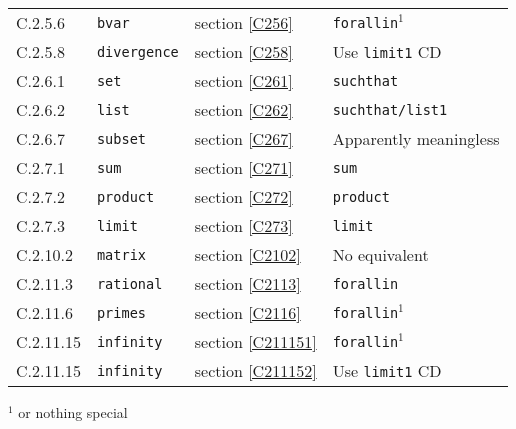 \documentclass{llncs}
\begin{document}
{\begin{table}[h]
\begin{tabular}{llll}
C.2.5.6&{\tt bvar}&section \ref{C256}&{\tt forallin}${}^1$\\
C.2.5.8&{\tt divergence}&section \ref{C258}&Use {\tt limit1} CD\\
C.2.6.1&{\tt set}&section \ref{C261}&{\tt suchthat}\\
C.2.6.2&{\tt list}&section \ref{C262}&{\tt suchthat/list1}\\
C.2.6.7&{\tt subset}&section \ref{C267}&Apparently meaningless\\
C.2.7.1&{\tt sum}&section \ref{C271}&{\tt sum}\\
C.2.7.2&{\tt product}&section \ref{C272}&{\tt product}\\
C.2.7.3&{\tt limit}&section \ref{C273}&{\tt limit}\\
C.2.10.2&{\tt matrix}&section \ref{C2102}&No equivalent\\
C.2.11.3&{\tt rational}&section \ref{C2113}&{\tt forallin}\\
C.2.11.6&{\tt primes}&section \ref{C2116}&{\tt forallin}${}^1$\\
C.2.11.15&{\tt infinity}&section \ref{C211151}&{\tt forallin}${}^1$\\
C.2.11.15&{\tt infinity}&section \ref{C211152}&Use {\tt limit1} CD\\
\end{tabular}
\begin{center}
${}^1$ or nothing special
\end{center}
\end{table}
}
\end{document}
